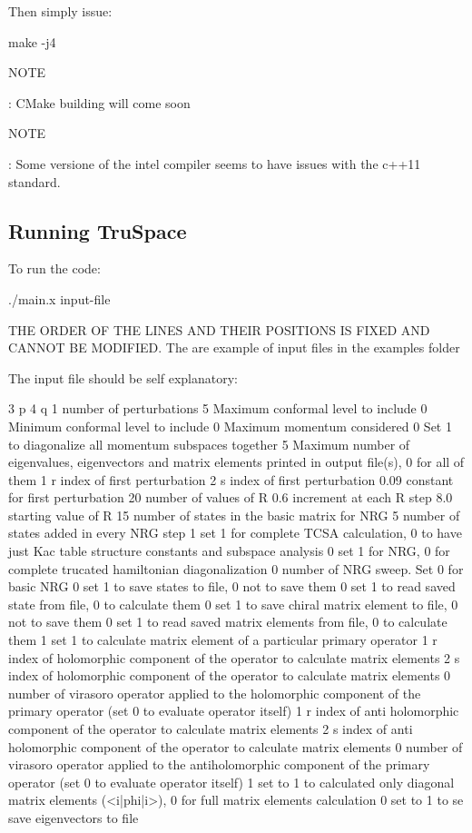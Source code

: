 Then simply issue\+: \begin{DoxyVerb}make -j4
\end{DoxyVerb}


N\+O\+TE

\+: C\+Make building will come soon

N\+O\+TE

\+: Some versione of the intel compiler seems to have issues with the c++11 standard.

\subsection*{Running Tru\+Space }

To run the code\+: \begin{DoxyVerb}./main.x input-file
\end{DoxyVerb}


T\+HE O\+R\+D\+ER OF T\+HE L\+I\+N\+ES A\+ND T\+H\+E\+IR P\+O\+S\+I\+T\+I\+O\+NS IS F\+I\+X\+ED A\+ND C\+A\+N\+N\+OT BE M\+O\+D\+I\+F\+I\+ED. The are example of input files in the {\ttfamily examples} folder

The input file should be self explanatory\+: \begin{DoxyVerb}3    p
4    q
1    number of perturbations
5    Maximum conformal level to include
0    Minimum conformal level to include
0    Maximum momentum considered
0    Set 1 to diagonalize all momentum subspaces together
5   Maximum number of eigenvalues, eigenvectors and matrix elements printed in output file(s), 0 for all of them
1    r index of first perturbation
2    s index of first perturbation
0.09  constant for first perturbation
20   number of values of R
0.6  increment at each R step
8.0  starting value of R 
15  number of states in the basic matrix for NRG
5   number of states added in every NRG step
1    set 1 for complete TCSA calculation, 0 to have just Kac table structure constants and subspace analysis
0    set 1 for NRG, 0 for complete trucated hamiltonian diagonalization
0    number of NRG sweep. Set 0 for basic NRG
0    set 1 to save states to file, 0 not to save them
0    set 1 to read saved state from file, 0 to calculate them
0    set 1 to save chiral matrix element to file, 0 not to save them
0    set 1 to read saved matrix elements from file, 0 to calculate them
1    set 1 to calculate matrix element of a particular primary operator
1    r index of holomorphic component of the operator to calculate matrix elements
2    s index of holomorphic component of the operator to calculate matrix elements
0    number of virasoro operator applied to the holomorphic component of the primary operator (set 0 to evaluate operator itself)
1    r index of anti holomorphic component of the operator to calculate matrix elements
2    s index of anti holomorphic component of the operator to calculate matrix elements
0    number of virasoro operator applied to the antiholomorphic component of the primary operator (set 0 to evaluate operator itself)
1    set to 1 to calculated only diagonal matrix elements (<i|phi|i>), 0 for full matrix elements calculation
0    set to 1 to se save eigenvectors to file
\end{DoxyVerb}


